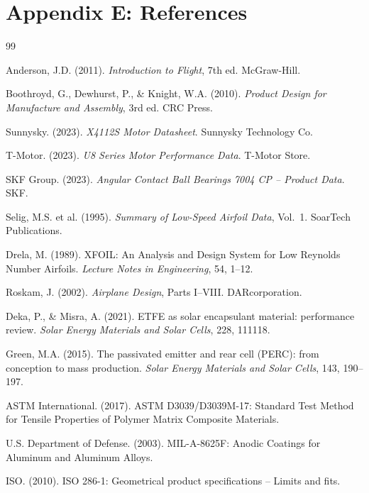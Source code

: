 \section*{Appendix E: References}

\begin{thebibliography}{99}

 Anderson, J.D. (2011). \textit{Introduction to Flight}, 7th ed. McGraw-Hill.

 Boothroyd, G., Dewhurst, P., \& Knight, W.A. (2010). \textit{Product Design for Manufacture and Assembly}, 3rd ed. CRC Press.

 Sunnysky. (2023). \textit{X4112S Motor Datasheet}. Sunnysky Technology Co.

 T-Motor. (2023). \textit{U8 Series Motor Performance Data}. T-Motor Store.

 SKF Group. (2023). \textit{Angular Contact Ball Bearings 7004 CP -- Product Data}. SKF.

 Selig, M.S. et al. (1995). \textit{Summary of Low-Speed Airfoil Data}, Vol.~1. SoarTech Publications.

 Drela, M. (1989). XFOIL: An Analysis and Design System for Low Reynolds Number Airfoils. \textit{Lecture Notes in Engineering}, 54, 1--12.

 Roskam, J. (2002). \textit{Airplane Design}, Parts I--VIII. DARcorporation.

 Deka, P., \& Misra, A. (2021). ETFE as solar encapsulant material: performance review. \textit{Solar Energy Materials and Solar Cells}, 228, 111118.

 Green, M.A. (2015). The passivated emitter and rear cell (PERC): from conception to mass production. \textit{Solar Energy Materials and Solar Cells}, 143, 190--197.

 ASTM International. (2017). ASTM D3039/D3039M-17: Standard Test Method for Tensile Properties of Polymer Matrix Composite Materials.

 U.S. Department of Defense. (2003). MIL-A-8625F: Anodic Coatings for Aluminum and Aluminum Alloys.

 ISO. (2010). ISO 286-1: Geometrical product specifications -- Limits and fits.

\end{thebibliography}
